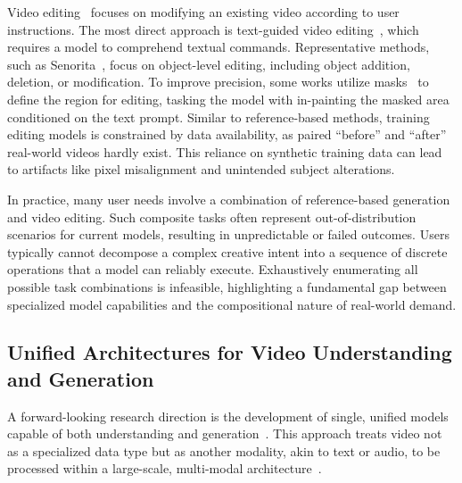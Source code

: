 \documentclass{article}
\begin{document}
Video editing~\citep{jiang2025vace,wei2025univideo} focuses on modifying an existing video according to user instructions. The most direct approach is text-guided video editing~\citep{he2025openve}, which requires a model to comprehend textual commands. 
Representative methods, such as Senorita~\citep{zi2025se}, focus on object-level editing, including object addition, deletion, or modification. To improve precision, some works utilize masks~\citep{cai2025omnivcus} to define the region for editing, tasking the model with in-painting the masked area conditioned on the text prompt. Similar to reference-based methods, training editing models is constrained by data availability, as paired ``before'' and ``after'' real-world videos hardly exist. This reliance on synthetic training data can lead to artifacts like pixel misalignment and unintended subject alterations.

In practice, many user needs involve a combination of reference-based generation and video editing. Such composite tasks often represent out-of-distribution scenarios for current models, resulting in unpredictable or failed outcomes. Users typically cannot decompose a complex creative intent into a sequence of discrete operations that a model can reliably execute. Exhaustively enumerating all possible task combinations is infeasible, highlighting a fundamental gap between specialized model capabilities and the compositional nature of real-world demand.

\subsection{Unified Architectures for Video Understanding and Generation}

A forward-looking research direction is the development of single, unified models capable of both understanding and generation~\citep{cui2025emu3,lin2025uniworld}. This approach treats video not as a specialized data type but as another modality, akin to text or audio, to be processed within a large-scale, multi-modal architecture~\citep{teng2025magi}.
\end{document}
